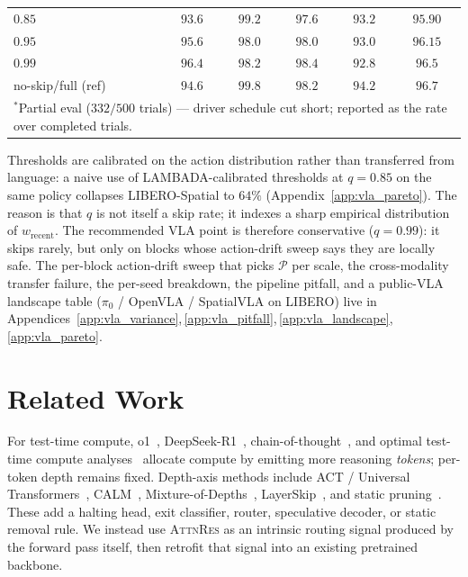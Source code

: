 \documentclass{article}
\newcommand{\attnres}{\textsc{AttnRes}}
\begin{document}
\begin{table}[t]
\begin{tabular}{lccccc}
$0.85$              & $93.6$ & $99.2$  & $97.6$  & $93.2$  & $95.90$ \\
$0.95$              & $95.6$ & $98.0$  & $98.0$  & $93.0$  & $96.15$ \\
$\mathbf{0.99}$     & $\mathbf{96.4}$ & $\mathbf{98.2}$  & $\mathbf{98.4}$  & $\mathbf{92.8}$  & $\mathbf{96.5}$ \\
no-skip/full (ref)  & $94.6$ & $99.8$  & $98.2$  & $94.2$  & $96.7$ \\
\bottomrule
\multicolumn{6}{p{14cm}}{\footnotesize $^\ast$Partial eval ($332/500$ trials) — driver schedule cut short; reported as the rate over completed trials.}
\end{tabular}
\end{table}

Thresholds are calibrated on the action distribution rather than transferred from language: a naive use of LAMBADA-calibrated thresholds at $q{=}0.85$ on the same policy collapses LIBERO-Spatial to $64\%$ (Appendix~\ref{app:vla_pareto}). The reason is that $q$ is not itself a skip rate; it indexes a sharp empirical distribution of $w_{\text{recent}}$. The recommended VLA point is therefore conservative ($q{=}0.99$): it skips rarely, but only on blocks whose action-drift sweep says they are locally safe. The per-block action-drift sweep that picks $\mathcal{P}$ per scale, the cross-modality transfer failure, the per-seed breakdown, the pipeline pitfall, and a public-VLA landscape table ($\pi_0$ / OpenVLA / SpatialVLA on LIBERO) live in Appendices~\ref{app:vla_variance},\,\ref{app:vla_pitfall},\,\ref{app:vla_landscape},\,\ref{app:vla_pareto}.

\section{Related Work}
\label{sec:related}

For test-time compute, o1~\citep{openai2024o1}, DeepSeek-R1~\citep{deepseek2025r1}, chain-of-thought~\citep{wei2022chain}, and optimal test-time compute analyses~\citep{snell2024scaling} allocate compute by emitting more reasoning \emph{tokens}; per-token depth remains fixed. Depth-axis methods include ACT / Universal Transformers~\citep{graves2016adaptive, dehghani2018universal}, CALM~\citep{schuster2022confident}, Mixture-of-Depths~\citep{raposo2024mixture}, LayerSkip~\citep{elhoushi2024layerskip}, and static pruning~\citep{gromov2024unreasonable, men2024shortgpt}. These add a halting head, exit classifier, router, speculative decoder, or static removal rule. We instead use \attnres{} as an intrinsic routing signal produced by the forward pass itself, then retrofit that signal into an existing pretrained backbone.
\end{document}
